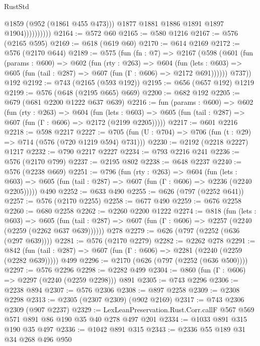 \begin{lexlean}{RustStd}
\begin{coremodule}
                          @1859
                          (@952 (@1861 @455 @473)))
                        @1877
                        @1881
                        @1886
                        @1891
                        @1897
                        @1904))))))))))
@2164 := @572 @60
@2165 := @580 @1216
@2167 := @576 (@2165 @595)
@2169 := @618 (@619 @60)
@2170 := @614 @2169
@2172 := @576 (@2170 @644)
@2189 := @575
    (fun (fn : @7) =>
    @2167
      (@598
        (@601
          (fun (params : @600) =>
          @602
            (fun (rty : @263) =>
            @604
              (fun (lets : @603) =>
              @605 (fun (tail : @287) => @607 (fun (Γ : @606) => @2172 @691))))))
        @737))
    @192
@2192 := @743 (@2165 (@593 @192))
@2195 := @656 (@657 @192) @1219
@2199 := @576 (@648 (@2195 @665) @669)
@2200 := @682 @192
@2205 := @679 (@681 @2200 @1222 @637 @639)
@2216 := fun (params : @600) =>
  @602
    (fun (rty : @263) =>
    @604
      (fun (lets : @603) =>
      @605 (fun (tail : @287) => @607 (fun (Γ : @606) => @2172 (@2199 @2205)))))
@2217 := @601 @2216
@2218 := @598 @2217
@2227 := @705 (fun (U : @704) => @706 (fun (t : @29) => @714 (@576 (@720 @1219 @594) @731)))
@2230 := @2192 (@2218 @2227) @1217
@2232 := @790 @2217 @2227
@2234 := @793 @2216 @241
@2236 := @576 (@2170 @799)
@2237 := @2195 @802
@2238 := @648 @2237
@2240 := @576 (@2238 @669)
@2251 := @796
    (fun (rty : @263) =>
    @604
      (fun (lets : @603) =>
      @605 (fun (tail : @287) => @607 (fun (Γ : @606) => @2236 (@2240 @2205)))))
    @490
@2252 := @633 @490
@2255 := @626 (@797 (@2252 @641))
@2257 := @576 (@2170 @2255)
@2258 := @677 @490
@2259 := @676 @2258
@2260 := @680 @2258
@2262 := @2260 @2200 @1222
@2274 := @818
    (fun (lets : @603) =>
    @605 (fun (tail : @287) => @607 (fun (Γ : @606) => @2257 (@2240 (@2259 (@2262 @637 @639))))))
    @278
@2279 := @626 (@797 (@2252 (@636 (@297 @639))))
@2281 := @576 (@2170 @2279)
@2282 := @2262 @278
@2291 := @842
    (fun (tail : @287) => @607 (fun (Γ : @606) => @2281 (@2240 (@2259 (@2282 @639)))))
    @499
@2296 := @2170 (@626 (@797 (@2252 (@636 @500))))
@2297 := @576 @2296
@2298 := @2282 @499
@2304 := @860 (fun (Γ : @606) => @2297 (@2240 (@2259 @2298))) @891
@2305 := @743 @2296
@2306 := @2238 @894
@2307 := @576 @2306
@2308 := @897 @2258
@2309 := @2308 @2298
@2313 := @2305 (@2307 @2309) (@902 @2169)
@2317 := @743 @2306 @2309 (@907 @2237)
@2329 := LexLeanPreservation.Rust.Corr.callF @567 @569 @571 @891 @86 @190 @35 @40 @278 @497 @201
@2334 := @1033 @891 @315 @190 @35 @497
@2336 := @1042 @891 @315
@2343 := @2336 @55 @189 @31 @34 @268 @496 @950

\end{coremodule}
\end{lexlean}

